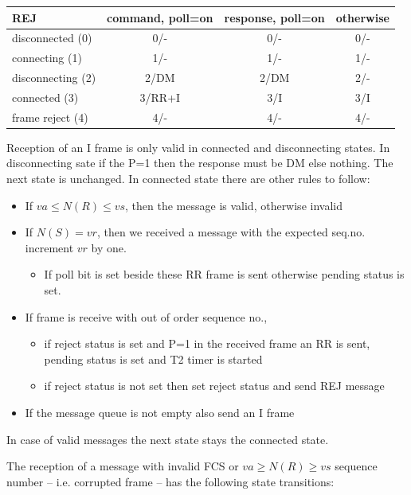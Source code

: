 \documentclass[a4paper]{article}
\begin{document}
{\footnotesize
\begin{center}
\begin{tabular}{|l|c|c|c|}
\hline
 REJ & command, poll=on & response, poll=on & otherwise \\
\hline
 disconnected (0) & 0/- & 0/- & 0/- \\
\hline
 connecting (1) & 1/- & 1/- & 1/- \\
\hline
 disconnecting (2) & 2/DM & 2/DM & 2/- \\
\hline
 connected (3) & 3/RR+I & 3/I & 3/I  \\
\hline
 frame reject (4) & 4/- & 4/- & 4/- \\
\hline
\end{tabular}
\end{center}
}

Reception of an I frame is only valid in connected and disconnecting states. In disconnecting sate if the P=1 then the response must be DM else nothing. The next state is unchanged. In connected state there are other rules to follow:

\begin{itemize}
\item If $va \leq N(R) \leq vs$, then the message is valid, otherwise invalid
\item If $N(S) = vr$, then we received a message with the expected seq.no. increment $vr$ by one.
\begin{itemize}
\item  If poll bit is set beside these RR frame is sent otherwise pending status is set.
\end{itemize}
\item If frame is receive with out of order sequence no., 
\begin{itemize}
\item if reject status is set and P=1 in the received frame an RR is sent, pending status is set and T2 timer is started
\item if reject status is not set then set reject status and send REJ message
\end{itemize}
\item If the message queue is not empty also send an I frame
\end{itemize}
In case of valid messages the next state stays the connected state.

The reception of a message with invalid FCS or  $va \geq N(R) \geq vs$ sequence number -- i.e. corrupted frame -- has the following state transitions:
\end{document}
